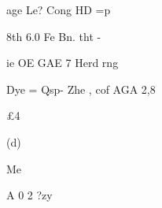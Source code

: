 \documentclass[UTF8,12pt,a4paper,openany]{ctexbook}
\begin{document}
\begin{enumerate}[label=\textbf{\arabic*.},leftmargin=2em]
age Le? Cong HD =p\par 8th 6.0 Fe  Bn. tht                       -\par ie OE GAE 7 Herd rng\par Dye = Qsp- Zhe ,  cof AGA 2,8\par £4\par (d)\par Me\par A     0        2 ?zy
\end{enumerate}
\end{document}
